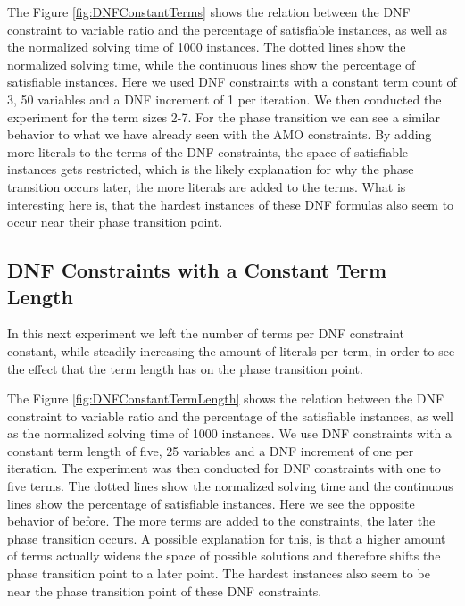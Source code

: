


The Figure \ref{fig:DNFConstantTerms} shows the relation between the DNF constraint to variable ratio and the percentage of satisfiable instances, as well as the normalized solving time of 1000 instances. The dotted lines show the normalized solving time, while the continuous lines show the percentage of satisfiable instances. Here we used DNF constraints with a constant term count of 3, 50 variables and a DNF increment of 1 per iteration. We then conducted the experiment for the term sizes 2-7. For the phase transition we can see a similar behavior to what we have already seen with the AMO constraints. By adding more literals to the terms of the DNF constraints, the space of satisfiable instances gets restricted, which is the likely explanation for why the phase transition occurs later, the more literals are added to the terms. What is interesting here is, that the hardest instances of these DNF formulas also seem to occur near their phase transition point.

\subsection{DNF Constraints with a Constant Term Length}

In this next experiment we left the number of terms per DNF constraint constant, while steadily increasing the amount of literals per term, in order to see the effect that the term length has on the phase transition point.

	

The Figure \ref{fig:DNFConstantTermLength} shows the relation between the DNF constraint to variable ratio and the percentage of the satisfiable instances, as well as the normalized solving time of 1000 instances. We use DNF constraints with a constant term length of five, 25 variables and a DNF increment of one per iteration. The experiment was then conducted for DNF constraints with one to five terms. The dotted lines show the normalized solving time and the continuous lines show the percentage of satisfiable instances. Here we see the opposite behavior of before. The more terms are added to the constraints, the later the phase transition occurs. A possible explanation for this, is that a higher amount of terms actually widens the space of possible solutions and therefore shifts the phase transition point to a later point. The hardest instances also seem to be near the phase transition point of these DNF constraints.

